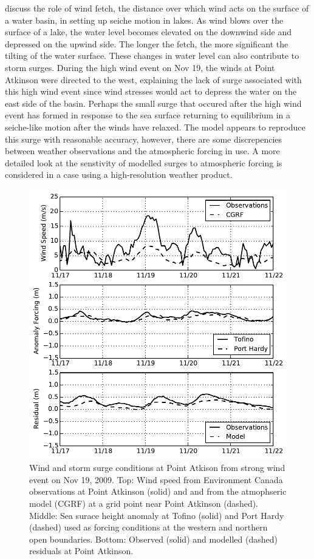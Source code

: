 \documentclass[pdftex,10pt]{article}
\begin{document}
\citet{danard2003storm} discuss the role of wind fetch, the distance over which wind acts on the surface of a water basin, in setting up seiche motion in lakes. As wind blows over the surface of a lake, the water level becomes elevated on the downwind side and depressed on the upwind side. The longer the fetch, the more significant the tilting of the water surface. These changes in water level can also contribute to storm surges.  During the high wind event on Nov 19, the winds at Point Atkinson were directed to the west, explaining the lack of surge associated with this high wind event since wind stresses would act to depress the water on the east side of the basin. Perhaps the small surge that occured after the high wind event has formed in response to the sea surface returning to equilibrium in a seiche-like motion after the winds have relaxed. The model appears to reproduce this surge with reasonable accuracy, however, there are some discrepencies between weather observations and the atmospheric forcing in use. A more detailed look at the senstivity of modelled surges to atmospheric forcing is considered in a case using a high-resolution weather product. 

\begin{figure}
\centering
\includegraphics[scale=0.6]{Figures/nov2009_bg.pdf}
\caption{Wind and storm surge conditions at Point Atkison from  strong wind event on Nov 19, 2009. Top: Wind speed from Environment Canada observations at Point Atkinson (solid) and and from the atmophseric model (CGRF) at a grid point near Point Atkinson (dashed). Middle: Sea surace height anomaly at Tofino (solid) and Port Hardy (dashed) used as forcing conditions at the western and northern open boundaries. Bottom: Observed (solid) and modelled (dashed) residuals at Point Atkinson.  }
\label{fig:nov2009}
\end{figure}
\end{document}
